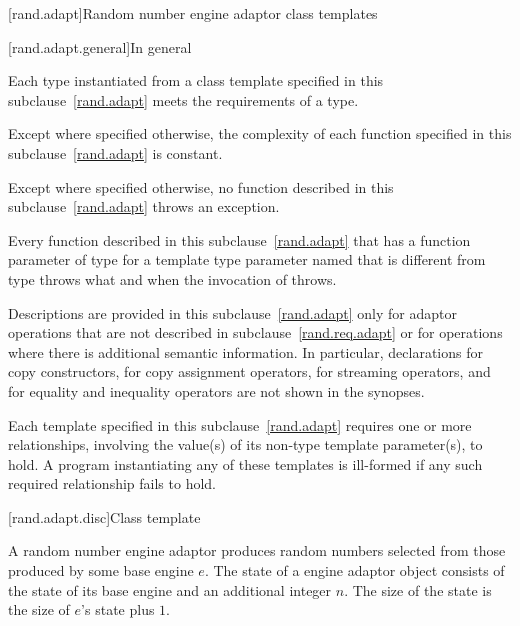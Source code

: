 

[rand.adapt]{Random number engine adaptor class templates}

[rand.adapt.general]{In general}

\pnum
Each type instantiated
from a class template specified in this subclause~\ref{rand.adapt}
meets the requirements
of a  type.

\pnum
Except where specified otherwise,
the complexity of each function
specified in this subclause~\ref{rand.adapt}
is constant.

\pnum
Except where specified otherwise,
no function described in this subclause~\ref{rand.adapt}
throws an exception.

\pnum
Every function described in this subclause~\ref{rand.adapt}
that has a function parameter  of type 
for a template type parameter named 
that is different from type 
throws what and when the invocation of  throws.

\pnum
Descriptions are provided in this subclause~\ref{rand.adapt}
only for adaptor operations
that are not described in subclause~\ref{rand.req.adapt}
or for operations where there is additional semantic information.
In particular,
declarations for copy constructors,
for copy assignment operators,
for streaming operators,
and for equality and inequality operators
are not shown in the synopses.

\pnum
Each template specified in this subclause~\ref{rand.adapt}
requires one or more relationships,
involving the value(s) of its non-type template parameter(s), to hold.
A program instantiating any of these templates
is ill-formed
if any such required relationship fails to hold.


[rand.adapt.disc]{Class template }%
%

\pnum
A  random number engine adaptor
produces random numbers
selected from those produced by some base engine $e$.
The state%
%
of a  engine adaptor object 
consists of the state  of its base engine 
and an additional integer $n$.
The size of the state is
 the size of $e$'s state plus $1$.

